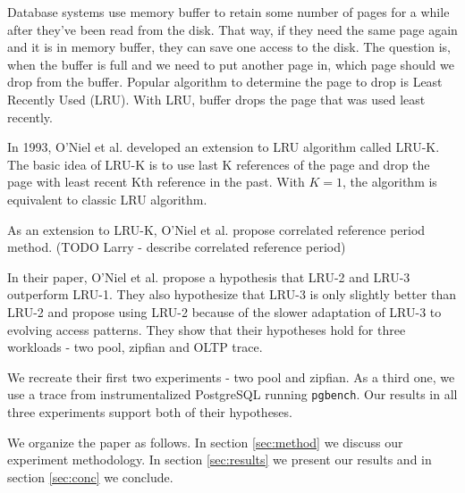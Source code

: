 Database systems use memory buffer to retain some number of pages for a while after they've been read from the disk. That way, if they need the same page again and it is in memory buffer, they can save one access to the disk. The question is, when the buffer is full and we need to put another page in, which page should we drop from the buffer. Popular algorithm to determine the page to drop is Least Recently Used (LRU). With LRU, buffer drops the page that was used least recently.

In 1993, O'Niel et al. \cite{lruk} developed an extension to LRU algorithm called LRU-K. The basic idea of LRU-K is to use last K references of the page and drop the page with least recent Kth reference in the past. With $K = 1$, the algorithm is equivalent to classic LRU algorithm.

As an extension to LRU-K, O'Niel et al. propose correlated reference period method. (TODO Larry - describe correlated reference period)

In their paper, O'Niel et al. propose a hypothesis that LRU-2 and LRU-3 outperform LRU-1. They also hypothesize that LRU-3 is only slightly better than LRU-2 and propose using LRU-2 because of the slower adaptation of LRU-3 to evolving access patterns. They show that their hypotheses hold for three workloads - two pool, zipfian and OLTP trace.

We recreate their first two experiments - two pool and zipfian. As a third one, we use a trace from instrumentalized PostgreSQL running \texttt{pgbench}. Our results in all three experiments support both of their hypotheses.

We organize the paper as follows. In section \ref{sec:method} we discuss our experiment methodology. In section \ref{sec:results} we present our results and in section \ref{sec:conc} we conclude.